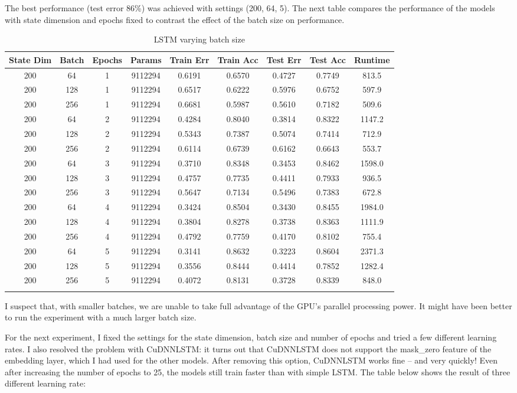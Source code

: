 \documentclass[letterpaper, 10pt]{article}
\begin{document}
The best performance (test error 86\%) was achieved with settings (200, 64, 5).
The next table compares the performance of the models with state dimension
and epochs fixed to contrast the effect of the batch size on performance.

\begin{longtable}{c | c | c | c | c | c | c | c | c}
State Dim & Batch & Epochs & Params & Train Err & Train Acc & Test Err & Test Acc & Runtime\\
\hline
\endhead
200 & 64 & 1 & 9112294 & 0.6191 & 0.6570 & 0.4727 & 0.7749 & 813.5 \\
200 & 128 & 1 & 9112294 & 0.6517 & 0.6222 & 0.5976 & 0.6752 & 597.9 \\
200 & 256 & 1 & 9112294 & 0.6681 & 0.5987 & 0.5610 & 0.7182 & 509.6 \\
\hline
200 & 64 & 2 & 9112294 & 0.4284 & 0.8040 & 0.3814 & 0.8322 & 1147.2 \\
200 & 128 & 2 & 9112294 & 0.5343 & 0.7387 & 0.5074 & 0.7414 & 712.9 \\
200 & 256 & 2 & 9112294 & 0.6114 & 0.6739 & 0.6162 & 0.6643 & 553.7 \\
\hline
200 & 64 & 3 & 9112294 & 0.3710 & 0.8348 & 0.3453 & 0.8462 & 1598.0 \\
200 & 128 & 3 & 9112294 & 0.4757 & 0.7735 & 0.4411 & 0.7933 & 936.5 \\
200 & 256 & 3 & 9112294 & 0.5647 & 0.7134 & 0.5496 & 0.7383 & 672.8 \\
\hline
200 & 64 & 4 & 9112294 & 0.3424 & 0.8504 & 0.3430 & 0.8455 & 1984.0 \\
200 & 128 & 4 & 9112294 & 0.3804 & 0.8278 & 0.3738 & 0.8363 & 1111.9 \\
200 & 256 & 4 & 9112294 & 0.4792 & 0.7759 & 0.4170 & 0.8102 & 755.4 \\
\hline
200 & 64 & 5 & 9112294 & 0.3141 & 0.8632 & 0.3223 & 0.8604 & 2371.3 \\
200 & 128 & 5 & 9112294 & 0.3556 & 0.8444 & 0.4414 & 0.7852 & 1282.4 \\
200 & 256 & 5 & 9112294 & 0.4072 & 0.8131 & 0.3728 & 0.8339 & 848.0 \\
\caption{LSTM varying batch size}
\label{tab:batchsizelstm}
\end{longtable}

I suspect that, with smaller batches, we are unable to take full advantage of the
GPU's parallel processing power. It might have been better to run the experiment
with a much larger batch size.

For the next experiment, I fixed the settings for the state dimension, batch size
and number of epochs and tried a few different learning rates. I also
resolved the problem with CuDNNLSTM: it turns out that CuDNNLSTM does not support
the mask\_zero feature of the embedding layer, which I had used for the other
models. After removing this option, CuDNNLSTM works fine -- and very quickly!
Even after increasing the number of epochs to 25, the models still train faster
than with simple LSTM. The table below shows the result of three different learning rate:
\end{document}
